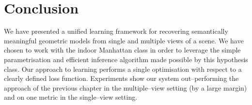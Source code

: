 \section{Conclusion}
\label{sec:conclusion}

We have presented a unified learning framework for recovering
semantically meaningful geometric models from single and multiple
views of a scene. We have chosen to work with the indoor Manhattan
class in order to leverage the simple parametrisation and efficient
inference algorithm made possible by this hypothesis class. Our
approach to learning performs a single optimisation with respect to a
clearly defined loss function. Experiments show our system
out--performing the approach of the previous chapter in the
multiple--view setting (by a large margin) and on one metric in the
single--view setting.
